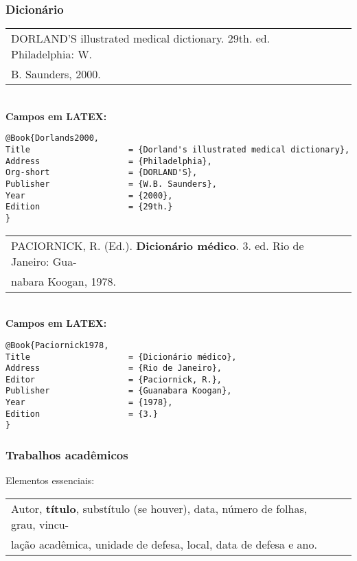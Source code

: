 \subsubsection{Dicionário}

\begin{tabular}{|l|c|} \hline
DORLAND'S illustrated medical dictionary. 29th. ed. Philadelphia: W.\\B. Saunders, 2000.   \\\hline
\end{tabular}\\


\textbf{Campos em LATEX:}

\begingroup
\fontsize{10pt}{12pt}\selectfont
\begin{verbatim}
@Book{Dorlands2000,
Title                    = {Dorland's illustrated medical dictionary},
Address                  = {Philadelphia},
Org-short                = {DORLAND'S},
Publisher                = {W.B. Saunders},
Year                     = {2000},
Edition                  = {29th.}
}\end{verbatim}
\endgroup


\begin{tabular}{|l|c|} \hline
PACIORNICK, R. (Ed.). \textbf{Dicionário médico}. 3. ed. Rio de Janeiro: Gua-\\nabara Koogan,  1978.  \\\hline
\end{tabular}\\


\textbf{Campos em LATEX:}

\begingroup
\fontsize{10pt}{12pt}\selectfont
\begin{verbatim}
@Book{Paciornick1978,
Title                    = {Dicionário médico},
Address                  = {Rio de Janeiro},
Editor                   = {Paciornick, R.},
Publisher                = {Guanabara Koogan},
Year                     = {1978},
Edition                  = {3.}
}\end{verbatim}
\endgroup
\subsubsection{Trabalhos acadêmicos}

Elementos essenciais: \\

\begin{tabular}{|l|c|} \hline
Autor, \textbf{título}, substítulo (se houver), data, número de folhas, grau, vincu-\\lação acadêmica, unidade de defesa, local, data de defesa e ano. \\\hline
\end{tabular}\\
\
 
